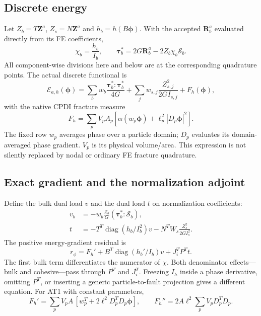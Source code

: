 \documentclass[11pt,a4paper]{article}
\newcommand{\Smat}{\bm{\mathcal S}}
\newcommand{\tauv}{\bm\tau}
\newcommand{\R}{\bm R}
\newcommand{\diag}{\operatorname{diag}}
\newcommand{\Ecal}{\mathscr E}
\newcommand{\vect}[1]{\boldsymbol{#1}}
\begin{document}
\subsection{Discrete energy}

Let $Z_b=T\vect Z^a$, $Z_s=N\vect Z^a$ and $h_b=h(B\vect\phi)$.
With the accepted $\R_b^a$ evaluated directly from its FE coefficients,
\begin{equation}
 \chi_b=\frac{h_b}{I_b},\qquad
 \tauv_b^*=2G\R_b^a-2Z_b\chi_b\Smat_b.
\end{equation}
All component-wise divisions here and below are at the corresponding quadrature
points. The actual discrete functional is
\begin{equation}
 \Ecal_{a,h}(\vect\phi)=
 \sum_b w_b\frac{\tauv_b^*:\tauv_b^*}{4G}
 +\sum_j w_{s,j}\frac{Z_{s,j}^2}{2G I_{s,j}}+F_h(\vect\phi),
 \label{eq:discrete-energy}
\end{equation}
with the native CPDI fracture measure
\begin{equation}
 F_h=\sum_p V_p A_p
       [\alpha(w_p\vect\phi)+\ell_p^2|D_p\vect\phi|^2].
 \label{eq:CPDI}
\end{equation}
The fixed row $w_p$ averages phase over a particle domain; $D_p$ evaluates its
domain-averaged phase gradient. $V_p$ is its physical volume/area. This expression
is not silently replaced by nodal or ordinary FE fracture quadrature.

\subsection{Exact gradient and the normalization adjoint}

Define the bulk dual load $v$ and the dual load $t$ on normalization coefficients:
\begin{align}
 v_b&=-w_b\frac{Z_b}G(\tauv_b^*:\Smat_b),\\
 t&=-T^T\diag(h_b/I_b^2)v
          -N^TW_s\frac{Z_s^2}{2G I_s^2}.
\end{align}
The positive energy-gradient residual is
\begin{equation}
 \boxed{r_\phi=F_h'
        +B^T\diag(h_b'/I_b)v+J_i^TP^Tt.}
 \label{eq:discrete-gradient}
\end{equation}
The first bulk term differentiates the numerator of $\chi$. Both denominator
effects---bulk and cohesive---pass through $P^T$ and $J_i^T$. Freezing $I_h$
inside a phase derivative, omitting $P^T$, or inserting a generic particle-to-fault
projection gives a different equation.
For AT1 with constant parameters,
\begin{equation}
 F_h'=\sum_p V_p A\,[w_p^T+2\ell^2D_p^TD_p\vect\phi],
 \qquad F_h''=2A\ell^2\sum_pV_pD_p^TD_p.
\end{equation}
\end{document}
